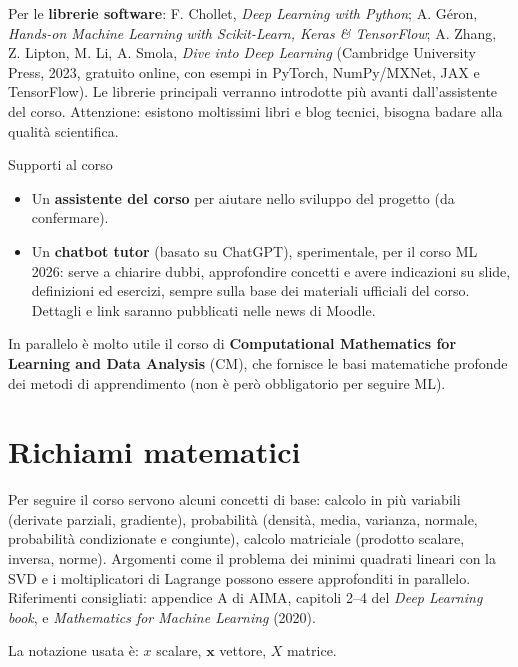 Per le \textbf{librerie software}: F. Chollet, \emph{Deep Learning with
Python}; A. Géron, \emph{Hands-on Machine Learning with Scikit-Learn,
Keras \& TensorFlow}; A. Zhang, Z. Lipton, M. Li, A. Smola, \emph{Dive
into Deep Learning} (Cambridge University Press, 2023, gratuito online,
con esempi in PyTorch, NumPy/MXNet, JAX e TensorFlow). Le librerie
principali verranno introdotte più avanti dall'assistente del corso.
Attenzione: esistono moltissimi libri e blog tecnici, bisogna badare
alla qualità scientifica.

\begin{boxnote}{Supporti al corso}

\begin{itemize}
\tightlist
\item
  Un \textbf{assistente del corso} per aiutare nello sviluppo del
  progetto (da confermare).
\item
  Un \textbf{chatbot tutor} (basato su ChatGPT), sperimentale, per il
  corso ML 2026: serve a chiarire dubbi, approfondire concetti e avere
  indicazioni su slide, definizioni ed esercizi, sempre sulla base dei
  materiali ufficiali del corso. Dettagli e link saranno pubblicati
  nelle news di Moodle.
\end{itemize}

\end{boxnote}

In parallelo è molto utile il corso di \textbf{Computational Mathematics
for Learning and Data Analysis} (CM), che fornisce le basi matematiche
profonde dei metodi di apprendimento (non è però obbligatorio per
seguire ML).

\section{Richiami matematici}\label{richiami-matematici}

Per seguire il corso servono alcuni concetti di base: calcolo in più
variabili (derivate parziali, gradiente), probabilità (densità, media,
varianza, normale, probabilità condizionate e congiunte), calcolo
matriciale (prodotto scalare, inversa, norme). Argomenti come il
problema dei minimi quadrati lineari con la SVD e i moltiplicatori di
Lagrange possono essere approfonditi in parallelo. Riferimenti
consigliati: appendice A di AIMA, capitoli 2--4 del \emph{Deep Learning
book}, e \emph{Mathematics for Machine Learning} (2020).

La notazione usata è: \(x\) scalare, \(\mathbf{x}\) vettore, \(X\)
matrice.

